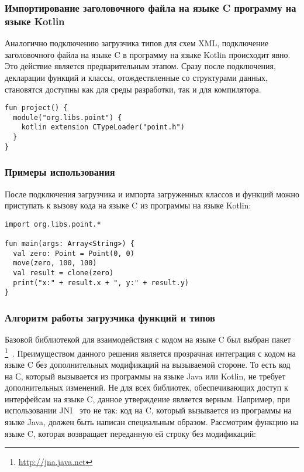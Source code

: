 \subsubsection{Импортирование заголовочного файла на языке C программу на языке Kotlin}
Аналогично подключению загрузчика типов для схем XML, подключение заголовочного файла на языке C в программу на языке Kotlin происходит явно.
Это действие является предварительным этапом. Сразу после подключения, декларации функций и классы, отождествленные со структурами данных, становятся доступны как для среды разработки, так и для компилятора.
\begin{code}\begin{lstlisting}[caption={Подключение заголовочного файла на языке C в программу на языке Kotlin.}, label={c-type-loading-extension-point}]
fun project() {
  module("org.libs.point") {
    kotlin extension CTypeLoader("point.h")
  }
}
\end{lstlisting}\end{code}

\begin{code}
\subsubsection{Примеры использования}
После подключения загрузчика и импорта загруженных классов и функций можно приступать к вызову кода на языке C из программы на языке Kotlin:
\begin{lstlisting}[caption={Пример работы с функциями и структурами данных, загруженных из заголовочного файла~\ref{point-h-example}.}, label=point-example]
import org.libs.point.*

fun main(args: Array<String>) {
  val zero: Point = Point(0, 0)
  move(zero, 100, 100)
  val result = clone(zero)
  print("x:" + result.x + ", y:" + result.y)
}
\end{lstlisting}\end{code}
\subsubsection{Алгоритм работы загрузчика функций и типов}

Базовой библиотекой для взаимодействия с кодом на языке C был выбран пакет \footnote{\url{http://jna.java.net}}~\cite{jna-book}.
Преимуществом данного решения является прозрачная интеграция с кодом на языке C без дополнительных модификаций на вызываемой стороне.
То есть код на С, который вызывается из программы на языке Java или Kotlin, не требует дополнительных изменений.
Не для всех библиотек, обеспечивающих доступ к интерфейсам на языке C, данное утверждение является верным.
Например, при использовании JNI~\cite{jni-spec} это не так: код на C, который вызывается из программы на языке Java, должен быть написан специальным образом.
Рассмотрим функцию на языке C, которая возвращает переданную ей строку без модификаций:

